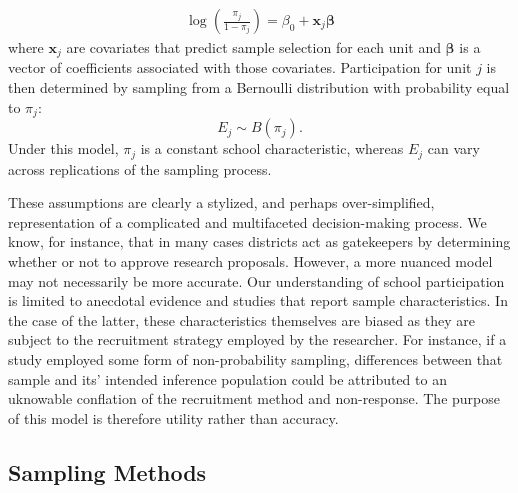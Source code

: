 \documentclass[
  english,
  man,floatsintext]{apa6}
\begin{document}
\begin{align}
\label{eq:RGM}
\log\left(\frac{\pi_j}{1 - \pi_j}\right) = \beta_0 + \mathbf{x}_j \boldsymbol\beta
\end{align}
where \(\mathbf{x}_j\) are covariates that predict sample selection for each unit and \(\boldsymbol\beta\) is a vector of coefficients associated with those covariates. Participation for unit \(j\) is then determined by sampling from a Bernoulli distribution with probability equal to \(\pi_j\):
\begin{equation}
\label{eq:Ej}
E_j \sim B(\pi_j).
\end{equation}
Under this model, \(\pi_j\) is a constant school characteristic, whereas \(E_j\) can vary across replications of the sampling process.

These assumptions are clearly a stylized, and perhaps over-simplified, representation of a complicated and multifaceted decision-making process.
We know, for instance, that in many cases districts act as gatekeepers by determining whether or not to approve research proposals.
However, a more nuanced model may not necessarily be more accurate.
Our understanding of school participation is limited to anecdotal evidence and studies that report sample characteristics.
In the case of the latter, these characteristics themselves are biased as they are subject to the recruitment strategy employed by the researcher.
For instance, if a study employed some form of non-probability sampling, differences between that sample and its' intended inference population could be attributed to an uknowable conflation of the recruitment method and non-response.
The purpose of this model is therefore utility rather than accuracy.

\hypertarget{sampling-methods}{%
\subsection{Sampling Methods}\label{sampling-methods}}
\end{document}
